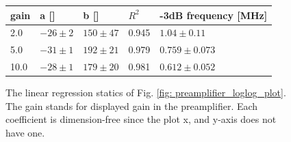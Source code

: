 \documentclass{article}
\begin{document}
  \begin{figure}[H]
    \centering
    \begin{tabular}{  m{2cm} | m{2.5cm} | m{2.5cm} | m{1cm}  | m{4cm}} 

      gain& a [] & b []& $R^2$ &-3dB frequency [MHz]\\ 
      \hline
        2.0 & $-26 \pm 2$& $150 \pm 47$ & 0.945& $1.04 \pm 0.11$\\
      \hline
        5.0 & $-31 \pm 1 $& $192 \pm 21$ & 0.979& $0.759 \pm 0.073$\\
      \hline
        10.0 &$ -28 \pm 1 $& $179 \pm 20$ & 0.981 & $0.612 \pm 0.052$ \\

    \end{tabular}
    \caption{
      The linear regression statics of Fig. \ref{fig: preamplifier_loglog_plot}.
      The gain stands for displayed gain in the preamplifier.
      Each coefficient is dimension-free since the plot x, and y-axis does not have one.
    }  
    \label{fig: preamplifier_statics}
\end{figure}
\end{document}
